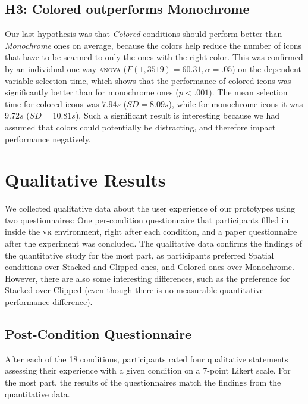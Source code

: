\documentclass[nobib]{tufte-book} %
\begin{document}
\subsection{H3: Colored outperforms Monochrome}
Our last hypothesis was that \emph{Colored} conditions should perform better than \emph{Monochrome} ones on average, because the colors help reduce the number of icons that have to be scanned to only the ones with the right color. This was confirmed by an individual one-way \textsc{anova} ($F(1,3519) = 60.31, \alpha = .05$) on the dependent variable selection time, which shows that the performance of colored icons was significantly better than for monochrome ones ($p < .001$). The mean selection time for colored icons was $7.94 s$ ($SD = 8.09 s$), while for monochrome icons it was $9.72 s$ ($SD = 10.81 s$). Such a significant result is interesting because we had assumed that colors could potentially be distracting, and therefore impact performance negatively.

\section{Qualitative Results}

We collected qualitative data about the user experience of our prototypes using two questionnaires: One per-condition questionnaire that participants filled in inside the \textsc{vr} environment, right after each condition, and a paper questionnaire after the experiment was concluded. The qualitative data confirms the findings of the quantitative study for the most part, as participants preferred Spatial conditions over Stacked and Clipped ones, and Colored ones over Monochrome. However, there are also some interesting differences, such as the preference for Stacked over Clipped (even though there is no measurable quantitative performance difference).

\subsection{Post-Condition Questionnaire}
After each of the 18 conditions, participants rated four qualitative statements assessing their experience with a given condition on a 7-point Likert scale. For the most part, the results of the questionnaires match the findings from the quantitative data.
\end{document}
